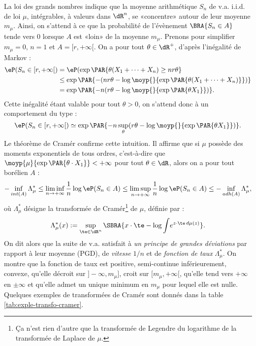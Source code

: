 La loi des grands nombres indique que la moyenne arithmétique $S_n$ de v.a.
i.i.d. de loi $\mu$, intégrables, à valeurs dans $\dR^n$, se «concentre»
autour de leur moyenne $m_\mu$. Ainsi, on s'attend à ce que la probabilité de
l'évènement $\BRA{S_n \in A}$ tende vers $0$ lorsque $A$ est «loin» de la
moyenne $m_\mu$. Prenons pour simplifier $m_\mu=0$, $n=1$ et $A=[r,+\infty[$.
On a pour tout $\theta\in\dR^+$, d'après l'inégalité de Markov :
\begin{align*}
\eP(S_n\in [r,+\infty[) 
 &= \eP(\exp\PAR{\theta (X_1+\cdots+X_n) \geq nr\theta}\\
 &\leq \exp\PAR{-(nr\theta-\log\moyp{}{\exp\PAR{\theta (X_1+\cdots+X_n)}})}\\
 &= \exp\PAR{-n(r\theta-\log\moyp{}{\exp\PAR{\theta X_1}})}.
\end{align*}
Cette inégalité étant valable pour tout $\theta>0$, on s'attend donc à un
comportement du type :
$$
\eP(S_n\in [r,+\infty[) \simeq 
\exp\PAR{-n\sup_\theta (r\theta-\log\moyp{}{\exp\PAR{\theta X_1}})}.
$$
Le théorème de Cramér confirme cette intuition. Il affirme que si $\mu$
possède des moments exponentiels de tous ordres, c'est-à-dire que
$\moyp{\mu}{\exp\PAR{\theta\cdot X_1}}<+\infty$ pour tout $\theta\in\dR$, alors
on a pour tout borélien $A$ :
$$
-\inf_{int(A)} \Lambda_\mu^*
\leq\liminf_{n\to+\infty} \frac{1}{n}\log\eP(S_n\in A)
\leq\limsup_{n\to+\infty} \frac{1}{n}\log\eP(S_n\in A)
\leq-\inf_{adh(A)} \Lambda_\mu^*,
$$
où $\Lambda_\mu^*$ désigne la transformée de Cramér\footnote{Ça n'est rien d'autre
  que la transformée de Legendre du logarithme de la transformée de Laplace de
  $\mu$.}  de $\mu$, définie par :
$$
\Lambda_\mu^*(x)
:=\sup_{\te\in\dR^n}\SBRA{x\cdot\te - \log\int\!e^{z\cdot\te\,d\mu(z)}}.
$$
On dit alors que la suite de v.a. satisfait à \emph{un principe de grandes
  déviations} par rapport à leur moyenne (PGD), de \emph{vitesse} $1/n$ et de
\emph{fonction de taux} $\Lambda_\mu^*$. On montre que la fonction de taux est
positive, semi-continue inférieurement, convexe, qu'elle décroit sur
$]-\infty,m_\mu]$, croit sur $[m_\mu,+\infty[$, qu'elle tend vers $+\infty$ en
$±\infty$ et qu'elle admet un unique minimum en $m_\mu$ pour lequel elle est
nulle. Quelques exemples de transformées de Cramér sont donnés dans la table
\ref{tab:exple-transfo-cramer}.

